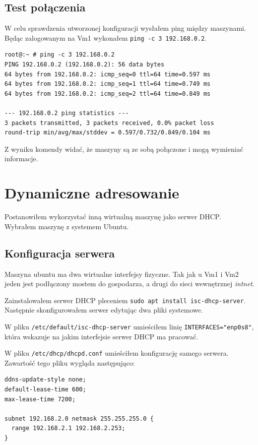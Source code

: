\documentclass{mwart} %
\begin{document}
\subsection{Test połączenia}
W celu sprawdzenia utworzonej konfiguracji wysłałem ping między maszynami. Będąc zalogowanym na Vm1 wykonałem \texttt{ping -c 3 192.168.0.2}.

\begin{verbatim}
root@:~ # ping -c 3 192.168.0.2
PING 192.168.0.2 (192.168.0.2): 56 data bytes
64 bytes from 192.168.0.2: icmp_seq=0 ttl=64 time=0.597 ms
64 bytes from 192.168.0.2: icmp_seq=1 ttl=64 time=0.749 ms
64 bytes from 192.168.0.2: icmp_seq=2 ttl=64 time=0.849 ms

--- 192.168.0.2 ping statistics ---
3 packets transmitted, 3 packets received, 0.0% packet loss
round-trip min/avg/max/stddev = 0.597/0.732/0.849/0.104 ms
\end{verbatim}

Z wyniku komendy widać, że maszyny są ze sobą połączone i mogą wymieniać informacje.

\section{Dynamiczne adresowanie}
Postanowiłem wykorzystać inną wirtualną maszynę jako serwer DHCP. Wybrałem maszynę z systemem Ubuntu.

\subsection{Konfiguracja serwera}
Maszyna ubuntu ma dwa wirtualne interfejsy fizyczne. Tak jak u Vm1 i Vm2 jeden jest podłączony mostem do gospodarza, a drugi do sieci wewnętrznej \textit{intnet}.

Zainstalowałem serwer DHCP pleceniem \texttt{sudo apt install isc-dhcp-server}. Następnie skonfigurowałem serwer edytując dwa pliki systemowe.

W pliku \texttt{/etc/default/isc-dhcp-server} umieściłem linię \texttt{INTERFACES="enp0s8"}, która wskazuje na jakim interfejsie serwer DHCP ma pracować.

W pliku \texttt{/etc/dhcp/dhcpd.conf} umieściłem konfigurację samego serwera. Zawartość tego pliku wygląda następująco:

\begin{verbatim}
ddns-update-style none;
default-lease-time 600;
max-lease-time 7200;

subnet 192.168.2.0 netmask 255.255.255.0 {
  range 192.168.2.1 192.168.2.253;
}
\end{verbatim}
\end{document}
